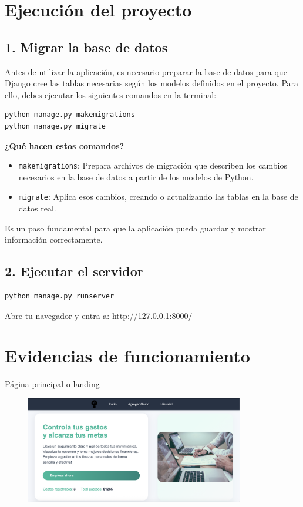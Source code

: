 \documentclass[12pt,a4paper]{article}
\begin{document}
\section{Ejecución del proyecto}

\subsection{1. Migrar la base de datos}

Antes de utilizar la aplicación, es necesario preparar la base de datos para que Django cree las tablas necesarias según los modelos definidos en el proyecto. Para ello, debes ejecutar los siguientes comandos en la terminal:

\begin{lstlisting}[language=bash]
python manage.py makemigrations
python manage.py migrate
\end{lstlisting}

\textbf{¿Qué hacen estos comandos?}

\begin{itemize}
    \item \texttt{makemigrations}: Prepara archivos de migración que describen los cambios necesarios en la base de datos a partir de los modelos de Python.
    \item \texttt{migrate}: Aplica esos cambios, creando o actualizando las tablas en la base de datos real.
\end{itemize}

Es un paso fundamental para que la aplicación pueda guardar y mostrar información correctamente.

\subsection{2. Ejecutar el servidor}

\begin{lstlisting}[language=bash]
python manage.py runserver
\end{lstlisting}

Abre tu navegador y entra a: \url{http://127.0.0.1:8000/}

\section{Evidencias de funcionamiento}
\caption{Página principal o landing}
\begin{figure}[H]
    \centering
    \includegraphics[width=0.85\textwidth]{Pagina Principal.png}
    \end{figure}
    
\end{document}
